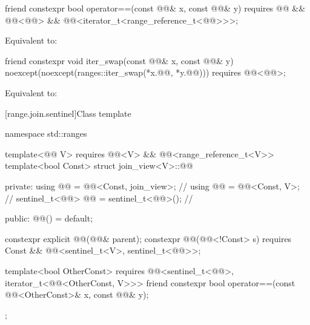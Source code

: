 %
\begin{itemdecl}
friend constexpr bool operator==(const @@& x, const @@& y)
  requires @@ && @@<@@> &&
           @@<iterator_t<range_reference_t<@@>>>;
\end{itemdecl}

\begin{itemdescr}
\pnum
\effects
Equivalent to:
\end{itemdescr}

%
\begin{itemdecl}
friend constexpr void iter_swap(const @@& x, const @@& y)
  noexcept(noexcept(ranges::iter_swap(*x.@@, *y.@@)))
  requires @@<@@>;
\end{itemdecl}

\begin{itemdescr}
\pnum
\effects
Equivalent to: 
\end{itemdescr}

[range.join.sentinel]{Class template }

%
\begin{codeblock}
namespace std::ranges {
  template<@@ V>
    requires @@<V> && @@<range_reference_t<V>>
  template<bool Const>
  struct join_view<V>::@@ {
  private:
    using @@ = @@<Const, join_view>;       // \expos
    using @@ = @@<Const, V>;                 // \expos
    sentinel_t<@@> @@ = sentinel_t<@@>();         // \expos

  public:
    @@() = default;

    constexpr explicit @@(@@& parent);
    constexpr @@(@@<!Const> s)
      requires Const && @@<sentinel_t<V>, sentinel_t<@@>>;

    template<bool OtherConst>
      requires @@<sentinel_t<@@>, iterator_t<@@<OtherConst, V>>>
    friend constexpr bool operator==(const @@<OtherConst>& x, const @@& y);
  };
}
\end{codeblock}

